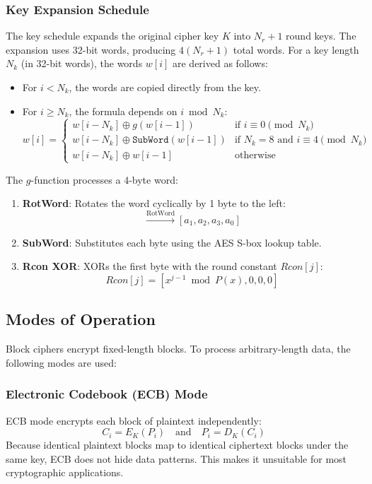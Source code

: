 \documentclass[11pt,a4paper]{article}
\begin{document}
\subsubsection{Key Expansion Schedule}
The key schedule expands the original cipher key $K$ into $N_r + 1$ round keys. The expansion uses 32-bit words, producing $4(N_r + 1)$ total words. For a key length $N_k$ (in 32-bit words), the words $w[i]$ are derived as follows:
\begin{itemize}
    \item For $i < N_k$, the words are copied directly from the key.
    \item For $i \ge N_k$, the formula depends on $i \bmod N_k$:
    \begin{equation}
        w[i] = \begin{cases}
            w[i-N_k] \oplus g(w[i-1]) & \text{if } i \equiv 0 \pmod{N_k} \\
            w[i-N_k] \oplus \mathtt{SubWord}(w[i-1]) & \text{if } N_k = 8 \text{ and } i \equiv 4 \pmod{N_k} \\
            w[i-N_k] \oplus w[i-1] & \text{otherwise}
        \end{cases}
    \end{equation}
\end{itemize}
The $g$-function processes a 4-byte word:
\begin{enumerate}
    \item \textbf{RotWord}: Rotates the word cyclically by 1 byte to the left:
    \begin{equation}
        [a_0, a_1, a_2, a_3] \xrightarrow{\text{RotWord}} [a_1, a_2, a_3, a_0]
    \end{equation}
    \item \textbf{SubWord}: Substitutes each byte using the AES S-box lookup table.
    \item \textbf{Rcon XOR}: XORs the first byte with the round constant $Rcon[j]$:
    \begin{equation}
        Rcon[j] = [x^{j-1} \bmod P(x), 0, 0, 0]
    \end{equation}
\end{enumerate}

\subsection{Modes of Operation}
Block ciphers encrypt fixed-length blocks. To process arbitrary-length data, the following modes are used:

\subsubsection{Electronic Codebook (ECB) Mode}
ECB mode encrypts each block of plaintext independently:
\begin{equation}
    C_i = E_K(P_i) \quad \text{and} \quad P_i = D_K(C_i)
\end{equation}
Because identical plaintext blocks map to identical ciphertext blocks under the same key, ECB does not hide data patterns. This makes it unsuitable for most cryptographic applications.
\end{document}
